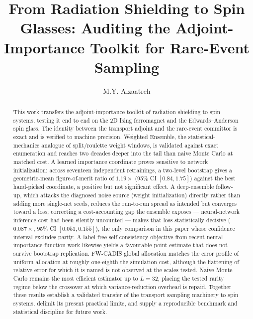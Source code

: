 \documentclass[a4paper,fleqn]{cas-sc}
\begin{document}
	\let\WriteBookmarks\relax
	\def\floatpagepagefraction{1}
	\def\textpagefraction{.001}
	
	
	
	\title[mode=title]{From Radiation Shielding to Spin Glasses: Auditing the Adjoint-Importance Toolkit for Rare-Event Sampling}
	
	\author{M.Y. Alzaatreh}
	
	
	\begin{abstract}
		This work transfers the adjoint-importance toolkit of radiation shielding to spin systems, testing it end to end on the 2D Ising ferromagnet and the Edwards--Anderson spin glass. The identity between the transport adjoint and the rare-event committor is exact and is verified to machine precision. Weighted Ensemble, the statistical-mechanics analogue of split/roulette weight windows, is validated against exact enumeration and reaches two decades deeper into the tail than naive Monte Carlo at matched cost. A learned importance coordinate proves sensitive to network initialization: across seventeen independent retrainings, a two-level bootstrap gives a geometric-mean figure-of-merit ratio of $1.19\times$ (95\% CI $[0.84,1.75]$) against the best hand-picked coordinate, a positive but not significant effect. A deep-ensemble follow-up, which attacks the diagnosed noise source (weight initialization) directly rather than adding more single-net seeds, reduces the run-to-run spread as intended but converges toward a loss; correcting a cost-accounting gap the ensemble exposes --- neural-network inference cost had been silently uncounted --- makes that loss statistically decisive ($0.087\times$, 95\% CI $[0.051,0.155]$), the only comparison in this paper whose confidence interval excludes parity. A label-free self-consistency objective from recent neural importance-function work likewise yields a favourable point estimate that does not survive bootstrap replication. FW-CADIS global allocation matches the error profile of uniform allocation at roughly one-eighth the simulation cost, although the flattening of relative error for which it is named is not observed at the scales tested. Naive Monte Carlo remains the most efficient estimator up to $L=32$, placing the tested rarity regime below the crossover at which variance-reduction overhead is repaid. Together these results establish a validated transfer of the transport sampling machinery to spin systems, delimit its present practical limits, and supply a reproducible benchmark and statistical discipline for future work.
	\end{abstract}
	
\end{document}
